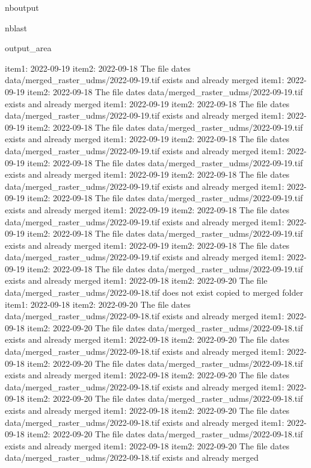 \documentclass[letterpaper,10pt]{sphinxmanual}
\begin{document}
\begin{sphinxuseclass}{nboutput}
\begin{sphinxuseclass}{nblast}
{\begin{sphinxuseclass}{output_area}
\begin{sphinxuseclass}{}
\begin{sphinxVerbatim}[commandchars=\\\{\}]
item1:  2022-09-19
item2:  2022-09-18
The file dates data/merged\_raster\_udms/2022-09-19.tif exists and already merged
item1:  2022-09-19
item2:  2022-09-18
The file dates data/merged\_raster\_udms/2022-09-19.tif exists and already merged
item1:  2022-09-19
item2:  2022-09-18
The file dates data/merged\_raster\_udms/2022-09-19.tif exists and already merged
item1:  2022-09-19
item2:  2022-09-18
The file dates data/merged\_raster\_udms/2022-09-19.tif exists and already merged
item1:  2022-09-19
item2:  2022-09-18
The file dates data/merged\_raster\_udms/2022-09-19.tif exists and already merged
item1:  2022-09-19
item2:  2022-09-18
The file dates data/merged\_raster\_udms/2022-09-19.tif exists and already merged
item1:  2022-09-19
item2:  2022-09-18
The file dates data/merged\_raster\_udms/2022-09-19.tif exists and already merged
item1:  2022-09-19
item2:  2022-09-18
The file dates data/merged\_raster\_udms/2022-09-19.tif exists and already merged
item1:  2022-09-19
item2:  2022-09-18
The file dates data/merged\_raster\_udms/2022-09-19.tif exists and already merged
item1:  2022-09-19
item2:  2022-09-18
The file dates data/merged\_raster\_udms/2022-09-19.tif exists and already merged
item1:  2022-09-19
item2:  2022-09-18
The file dates data/merged\_raster\_udms/2022-09-19.tif exists and already merged
item1:  2022-09-19
item2:  2022-09-18
The file dates data/merged\_raster\_udms/2022-09-19.tif exists and already merged
item1:  2022-09-18
item2:  2022-09-20
The file data/merged\_raster\_udms/2022-09-18.tif does not exist copied to merged folder
item1:  2022-09-18
item2:  2022-09-20
The file dates data/merged\_raster\_udms/2022-09-18.tif exists and already merged
item1:  2022-09-18
item2:  2022-09-20
The file dates data/merged\_raster\_udms/2022-09-18.tif exists and already merged
item1:  2022-09-18
item2:  2022-09-20
The file dates data/merged\_raster\_udms/2022-09-18.tif exists and already merged
item1:  2022-09-18
item2:  2022-09-20
The file dates data/merged\_raster\_udms/2022-09-18.tif exists and already merged
item1:  2022-09-18
item2:  2022-09-20
The file dates data/merged\_raster\_udms/2022-09-18.tif exists and already merged
item1:  2022-09-18
item2:  2022-09-20
The file dates data/merged\_raster\_udms/2022-09-18.tif exists and already merged
item1:  2022-09-18
item2:  2022-09-20
The file dates data/merged\_raster\_udms/2022-09-18.tif exists and already merged
item1:  2022-09-18
item2:  2022-09-20
The file dates data/merged\_raster\_udms/2022-09-18.tif exists and already merged
item1:  2022-09-18
item2:  2022-09-20
The file dates data/merged\_raster\_udms/2022-09-18.tif exists and already merged

\end{sphinxVerbatim}
\end{sphinxuseclass}
\end{sphinxuseclass}}
\end{sphinxuseclass}
\end{sphinxuseclass}
\end{document}

